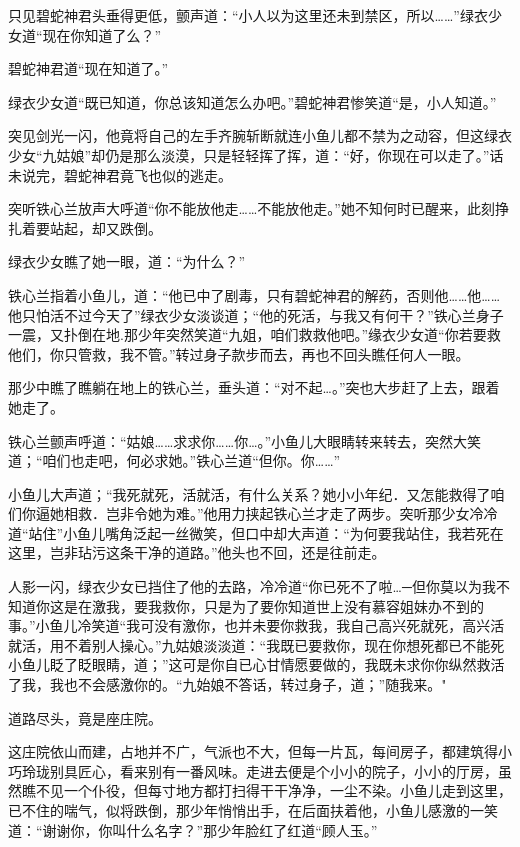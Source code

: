 \documentclass[12pt,oneside]{book}
\begin{document}
只见碧蛇神君头垂得更低，颤声道：``小人以为这里还未到禁区，所以\ldots\ldots{}''绿衣少女道``现在你知道了么？''

碧蛇神君道``现在知道了。''

绿衣少女道``既已知道，你总该知道怎么办吧。''碧蛇神君惨笑道``是，小人知道。''

突见剑光一闪，他竟将自己的左手齐腕斩断就连小鱼儿都不禁为之动容，但这绿衣少女``九姑娘''却仍是那么淡漠，只是轻轻挥了挥，道：``好，你现在可以走了。''话未说完，碧蛇神君竟飞也似的逃走。

突听铁心兰放声大呼道``你不能放他走\ldots\ldots 不能放他走。''她不知何时已醒来，此刻挣扎着要站起，却又跌倒。

绿衣少女瞧了她一眼，道：``为什么？''

铁心兰指着小鱼儿，道：``他已中了剧毒，只有碧蛇神君的解药，否则他\ldots\ldots 他\ldots\ldots 他只怕活不过今天了''绿衣少女淡谈道；``他的死活，与我又有何干？''铁心兰身子一震，又扑倒在地.那少年突然笑道``九姐，咱们救救他吧。''缘衣少女道``你若要救他们，你只管救，我不管。''转过身子款步而去，再也不回头瞧任何人一眼。

那少中瞧了瞧躺在地上的铁心兰，垂头道：``对不起\ldots。''突也大步赶了上去，跟着她走了。

铁心兰颤声呼道：``姑娘\ldots\ldots 求求你\ldots\ldots 你\ldots。''小鱼儿大眼睛转来转去，突然大笑道；``咱们也走吧，何必求她。''铁心兰道``但你。你\ldots\ldots{}''

小鱼儿大声道；``我死就死，活就活，有什么关系？她小小年纪．又怎能救得了咱们你逼她相救．岂非令她为难。''他用力挟起铁心兰才走了两步。突听那少女冷冷道``站住''小鱼儿嘴角泛起一丝微笑，但口中却大声道：``为何要我站住，我若死在这里，岂非玷污这条干净的道路。''他头也不回，还是往前走。

人影一闪，绿衣少女已挡住了他的去路，冷冷道``你已死不了啦\ldots─但你莫以为我不知道你这是在激我，要我救你，只是为了要你知道世上没有慕容姐妹办不到的事。''小鱼儿冷笑道``我可没有激你，也并未要你救我，我自己高兴死就死，高兴活就活，用不着别人操心。''九姑娘淡淡道：``我既已要救你，现在你想死都已不能死小鱼儿眨了眨眼睛，道；''这可是你自已心甘情愿要做的，我既未求你你纵然救活了我，我也不会感激你的。``九始娘不答话，转过身子，道；''随我来。"

道路尽头，竟是座庄院。

这庄院依山而建，占地并不广，气派也不大，但每一片瓦，每间房子，都建筑得小巧玲珑别具匠心，看来别有一番风味。走进去便是个小小的院子，小小的厅房，虽然瞧不见一个仆役，但每寸地方都打扫得干干净净，一尘不染。小鱼儿走到这里，已不住的喘气，似将跌倒，那少年悄悄出手，在后面扶着他，小鱼儿感激的一笑道：``谢谢你，你叫什么名字？''那少年脸红了红道``顾人玉。''
\end{document}
